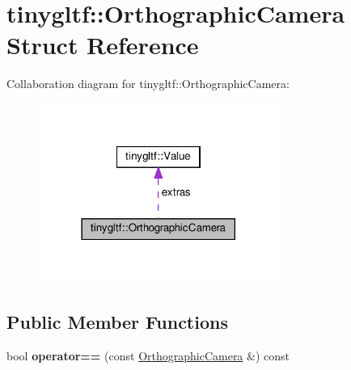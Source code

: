 \hypertarget{structtinygltf_1_1OrthographicCamera}{}\section{tinygltf\+:\+:Orthographic\+Camera Struct Reference}
\label{structtinygltf_1_1OrthographicCamera}


Collaboration diagram for tinygltf\+:\+:Orthographic\+Camera\+:\nopagebreak
\begin{figure}[H]
\begin{center}
\leavevmode
\includegraphics[width=222pt]{structtinygltf_1_1OrthographicCamera__coll__graph}
\end{center}
\end{figure}
\subsection*{Public Member Functions}
\begin{DoxyCompactItemize}
\item 
\mbox{\label{structtinygltf_1_1OrthographicCamera_a186aa1efea4a1ef67c5f1bf1adf77e76}} 
bool {\bfseries operator==} (const \hyperlink{structtinygltf_1_1OrthographicCamera}{Orthographic\+Camera} \&) const
\end{DoxyCompactItemize}
